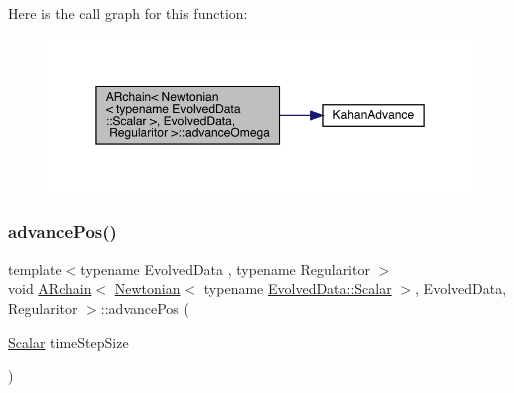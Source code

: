 Here is the call graph for this function\+:
\nopagebreak
\begin{figure}[H]
\begin{center}
\leavevmode
\includegraphics[width=350pt]{class_a_rchain_3_01_newtonian_3_01typename_01_evolved_data_1_1_scalar_01_4_00_01_evolved_data_00_01_regularitor_01_4_a8427d55e9b05fca4a1db2b9024940e06_cgraph}
\end{center}
\end{figure}
\mbox{\label{class_a_rchain_3_01_newtonian_3_01typename_01_evolved_data_1_1_scalar_01_4_00_01_evolved_data_00_01_regularitor_01_4_adffd5a74134d2a87e4f07908ea5beef4}} 
\subsubsection{\texorpdfstring{advance\+Pos()}{advancePos()}}
{\footnotesize\ttfamily template$<$typename Evolved\+Data , typename Regularitor $>$ \\
void \mbox{\hyperlink{class_a_rchain}{A\+Rchain}}$<$ \mbox{\hyperlink{class_newtonian}{Newtonian}}$<$ typename \mbox{\hyperlink{class_a_rchain_a707e42a79e4744424a34c9007e84ee07}{Evolved\+Data\+::\+Scalar}} $>$, Evolved\+Data, Regularitor $>$\+::advance\+Pos (\begin{DoxyParamCaption}\item[{\mbox{\hyperlink{class_a_rchain_3_01_newtonian_3_01typename_01_evolved_data_1_1_scalar_01_4_00_01_evolved_data_00_01_regularitor_01_4_a2c77dc1b58a25ac5c6ee95dd7809f693}{Scalar}}}]{time\+Step\+Size }\end{DoxyParamCaption})}

